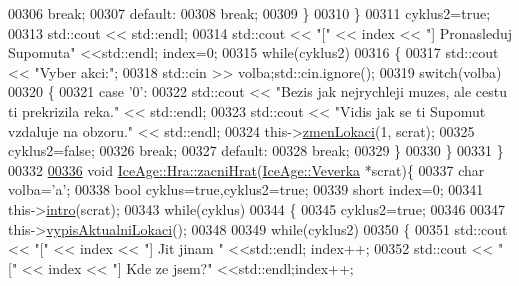 \begin{DoxyCode}
00306                     \textcolor{keywordflow}{break};
00307                 \textcolor{keywordflow}{default}:
00308                     \textcolor{keywordflow}{break};
00309             \}
00310     \}
00311     cyklus2=\textcolor{keyword}{true};
00313     std::cout << std::endl;
00314     std::cout << \textcolor{stringliteral}{"["} << index << \textcolor{stringliteral}{"] Pronasleduj Supomuta"} <<std::endl; index=0;
00315     \textcolor{keywordflow}{while}(cyklus2) 
00316     \{
00317             std::cout << \textcolor{stringliteral}{"Vyber akci:"};
00318             std::cin >> volba;std::cin.ignore();
00319             \textcolor{keywordflow}{switch}(volba)
00320             \{
00321                 \textcolor{keywordflow}{case} \textcolor{charliteral}{'0'}:
00322                     std::cout << \textcolor{stringliteral}{"Bezis jak nejrychleji muzes, ale cestu ti prekrizila reka."} << std::endl;
00323                     std::cout << \textcolor{stringliteral}{"Vidis jak se ti Supomut vzdaluje na obzoru."} << std::endl;
00324                     this->\hyperlink{classIceAge_1_1Hra_a9429d4476f187d8a80dde5944704fab7}{zmenLokaci}(1, scrat); 
00325                     cyklus2=\textcolor{keyword}{false};
00326                     \textcolor{keywordflow}{break};
00327                 \textcolor{keywordflow}{default}:
00328                     \textcolor{keywordflow}{break};
00329             \}
00330     \}
00331 \}
00332 
\hypertarget{Hra_8cpp_source.tex_l00336}{}\hyperlink{classIceAge_1_1Hra_a60ee65556b0198201f3e5fd8d2cd97e0}{00336} \textcolor{keywordtype}{void} \hyperlink{classIceAge_1_1Hra_a60ee65556b0198201f3e5fd8d2cd97e0}{IceAge::Hra::zacniHrat}(\hyperlink{classIceAge_1_1Veverka}{IceAge::Veverka} *scrat)\{
00337     \textcolor{keywordtype}{char} volba=\textcolor{charliteral}{'a'};
00338     \textcolor{keywordtype}{bool} cyklus=\textcolor{keyword}{true},cyklus2=\textcolor{keyword}{true}; 
00339     \textcolor{keywordtype}{short} index=0;
00341     this->\hyperlink{classIceAge_1_1Hra_acca9aa3823d78712b66e371fabbaf351}{intro}(scrat); 
00343     \textcolor{keywordflow}{while}(cyklus)
00344     \{
00345         cyklus2=\textcolor{keyword}{true};
00346 
00347         this->\hyperlink{classIceAge_1_1Hra_af0fafa4884c5107939edc907cc7de1a9}{vypisAktualniLokaci}();
00348 
00349         \textcolor{keywordflow}{while}(cyklus2) 
00350         \{
00351             std::cout << \textcolor{stringliteral}{"["} << index << \textcolor{stringliteral}{"] Jit jinam "} <<std::endl; index++;
00352             std::cout << \textcolor{stringliteral}{"["} << index << \textcolor{stringliteral}{"] Kde ze jsem?"} <<std::endl;index++;

\end{DoxyCode}
